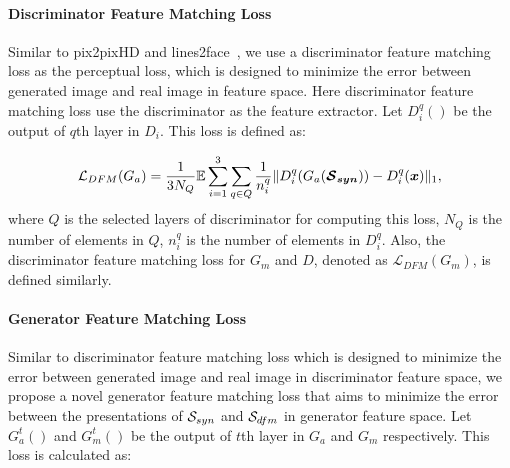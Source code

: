 \paragraph{Discriminator Feature Matching Loss} Similar to pix2pixHD\cite{pix2pixHD} and lines2face~\cite{Lines2Face}, we use a discriminator feature matching loss as the perceptual loss, which is designed to minimize the error between generated image and real image in feature space. Here discriminator feature matching loss use the discriminator as the feature extractor. Let $D^q_i()$ be the output of $q$th layer in $D_i$. This loss is defined as:

\begin{equation}
\label{eqn:feature_matching_loss}
\mathcal{L}_{DFM}(G_a)=\frac{1}{3N_Q}\mathbb{E}\sum_{i=1}^{3}\sum_{q\in Q} \frac{1}{n_i^q} \|D^q_i(G_a(\bm{\mathcal{S}_{syn}}))-D^q_i(\bm{x})\|_1 ,
\end{equation}
where $Q$ is the selected layers of discriminator for computing this loss, $N_Q$ is the number of elements in $Q$, $n^q_i$ is the number of elements in $D^q_i$.
Also, the discriminator feature matching loss for $G_m$ and $D$, denoted as $\mathcal{L}_{DFM}(G_m)$, is defined similarly.

\paragraph{Generator Feature Matching Loss}
Similar to discriminator feature matching loss which is designed to minimize the error between generated image and real image in discriminator feature space, we propose a novel generator feature matching loss that aims to minimize the error between the presentations of $\mathcal{S}_{syn}$ and $\mathcal{S}_{dfm}$ in generator feature space. Let $G_a^t()$ and $G_m^t()$ be the output of $t$th layer in $G_a$ and $G_m$ respectively. This loss is calculated as:


